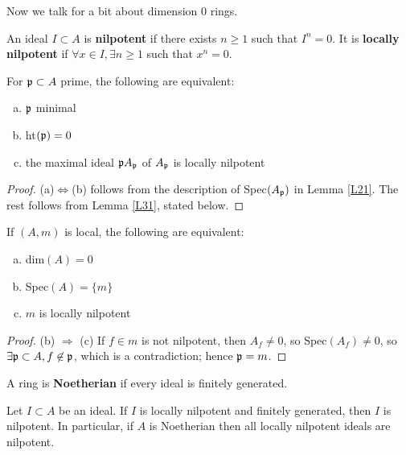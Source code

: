 \documentclass{../mathnotes}
\begin{document}
Now we talk for a bit about dimension 0 rings.

\begin{defn}
An ideal $I\subset A$ is \textbf{nilpotent} if there exists $n\geq 1$ such that $I^n = 0$. It is \textbf{locally nilpotent} if $\forall x\in I, \exists n\geq 1$ such that $x^n=0$.
\end{defn}

\begin{lem}
\label{L30}
For $\mathfrak p \subset A$ prime, the following are equivalent:
\begin{enumerate} [(a)]
\item $\mathfrak p$ minimal
\item ht$(\mathfrak p) = 0$
\item the maximal ideal $\mathfrak pA_{\mathfrak p}$ of $A_{\mathfrak p}$ is locally nilpotent
\end{enumerate}
\end{lem}

\begin{proof}
(a)$\Leftrightarrow $(b) follows from the description of Spec$(A_{\mathfrak p})$ in Lemma \ref{L21}. The rest follows from Lemma \ref{L31}, stated below.
\end{proof}

\begin{lem}
\label{L31}
If $(A, m)$ is local, the following are equivalent:
\begin{enumerate} [(a)]
\item dim$(A) = 0$
\item Spec$(A) = \{m\}$
\item $m$ is locally nilpotent
\end{enumerate}
\end{lem}

\begin{proof}
(b) $\Rightarrow$ (c) If $f\in m$ is not nilpotent, then $A_f \neq 0$, so Spec$(A_f) \neq 0$, so $\exists \mathfrak p\subset A, f \not \in \mathfrak p$, which is a contradiction; hence $\mathfrak p = m$.
\end{proof}


\begin{defn}
A ring is \textbf{Noetherian} if every ideal is finitely generated.
\end{defn}

\begin{lem}
\label{L32}
Let $I\subset A$ be an ideal. If $I$ is locally nilpotent and finitely generated, then $I$ is nilpotent. In particular, if $A$ is Noetherian then all locally nilpotent ideals are nilpotent.
\end{lem}
\end{document}
